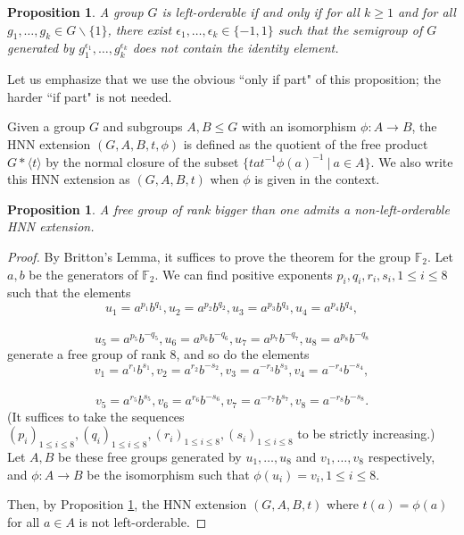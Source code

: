 \documentclass[12pt]{amsart}
\newtheorem{prop}[thm]{Proposition}
\theoremstyle{definition}
\begin{document}
 \begin{prop} \label{thm:criterion} A group $G$ is left-orderable if and only if for all $k\geq 1$ and for all $g_1, \dots , g_k\in G\backslash \{1\}$, there exist $\epsilon _1, \dots , \epsilon _k\in \{-1,1\}$ such that the semigroup of $G$ generated by $g_1^{\epsilon _1}, \dots , g_k^{\epsilon _k}$ does not contain the identity element.
 \end{prop}
 
 Let us emphasize that we use the obvious ``only if part" of this proposition; the harder ``if part" is not needed.
 
 Given a group $G$ and subgroups $A, B\leq G$ with an isomorphism $\phi :A\to B$, the HNN extension $(G, A, B, t, \phi )$ is defined as the quotient of the free product $G\ast \langle t \rangle $ by the normal closure of the subset $\{tat^{-1}\phi (a)^{-1} \ | \ a\in A\}$. We also write this HNN extension as $(G, A, B, t)$ when $\phi $ is given in the context.   
 
 
 
 \begin{prop}\label{them:free} A free group of rank bigger than one admits a non-left-orderable HNN extension.
 \end{prop}
 
 \begin{proof} By Britton's Lemma, it suffices to prove the theorem for the group $\mathbb{F}_2$. Let $a, b$ be the generators of $\mathbb{F}_2$. We can find positive exponents $p_i, q_i, r_i, s_i,  1\leq i\leq 8$ such that the elements $$u_1 = a^{p_1}b^{q_1}, u_2 = a^{p_2}b^{q_2}, u_3 = a^{p_3}b^{q_3}, u_4 = a^{p_4}b^{q_4},$$ \ $$u_5 = a^{p_5}b^{-q_5}, u_6 = a^{p_6}b^{-q_6}, u_7 = a^{p_7}b^{-q_7}, u_8 = a^{p_8}b^{-q_8}$$ generate a free group of rank 8, and so do the elements $$v_1 = a^{r_1}b^{s_1}, v_2 = a^{r_2}b^{-s_2}, v_3 = a^{-r_3}b^{s_3}, v_4 = a^{-r_4}b^{-s_4},$$ \ $$v_5 = a^{r_5}b^{s_5}, v_6 = a^{r_6}b^{-s_6}, v_7 = a^{-r_7}b^{s_7}, v_8 = a^{-r_8}b^{-s_8}.$$ (It suffices to take the sequences $(p_i)_{1\leq i\leq 8}, (q_i)_{1\leq i\leq 8}, (r_i)_{1\leq i\leq 8}, (s_i)_{1\leq i\leq 8}$ to be strictly increasing.) Let $A, B$ be these free groups generated by $u_1, \dots , u_8$ and $v_1, \dots , v_8$ respectively, and $\phi :A\to B$ be the isomorphism such that $\phi (u_i) = v_i, 1\leq i\leq 8.$ 
 
 \medskip
 
 Then, by Proposition \ref{thm:criterion}, the HNN extension $(G, A, B, t)$ where $t(a) = \phi (a)$ for all $a\in A$ is not left-orderable.   
 \end{proof}
 
\end{document}
